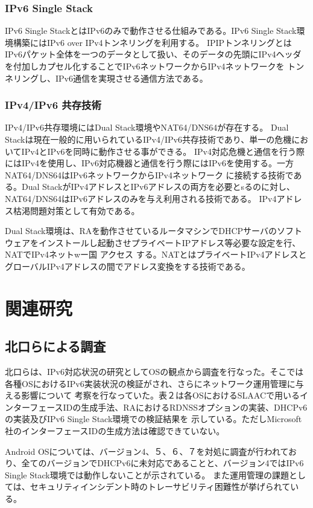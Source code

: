 \documentclass[a4j]{jarticle}
\begin{document}
\subsubsection{IPv6 Single Stack}
IPv6 Single StackとはIPv6のみで動作させる仕組みである。IPv6 Single Stack環境構築にはIPv6 over IPv4トンネリングを利用する。
IPIPトンネリングとはIPv6パケット全体を一つのデータとして扱い、そのデータの先頭にIPv4ヘッダを付加しカプセル化することでIPv6ネットワークからIPv4ネットワークを
トンネリングし、IPv6通信を実現させる通信方法である。
\subsubsection{IPv4/IPv6 共存技術}
IPv4/IPv6共存環境にはDual Stack環境やNAT64/DNS64が存在する。
Dual Stackは現在一般的に用いられているIPv4/IPv6共存技術であり、単一の危機においてIPv4とIPv6を同時に動作させる事ができる。
IPv4対応危機と通信を行う際にはIPv4を使用し、IPv6対応機器と通信を行う際にはIPv6を使用する。一方NAT64/DNS64はIPv6ネットワークからIPv4ネットワーク
に接続する技術である。Dual StackがIPv4アドレスとIPv6アドレスの両方を必要とsるのに対し、NAT64/DNS64はIPv6アドレスのみを与え利用される技術である。
IPv4アドレス枯渇問題対策として有効である。

Dual Stack環境は、RAを動作させているルータマシンでDHCPサーバのソフトウェアをインストールし起動させプライベートIPアドレス等必要な設定を行、NATでIPv4ネットwー国
アクセス
する。NATとはプライベートIPv4アドレスとグローバルIPv4アドレスの間でアドレス変換をする技術である。

\newpage
\section{関連研究} %
\subsection{北口らによる調査}
北口らは、IPv6対応状況の研究としてOSの観点から調査を行なった。そこでは各種OSにおけるIPv6実装状況の検証がされ、さらにネットワーク運用管理に与える影響について
考察を行なっていた。表２は各OSにおけるSLAACで用いるインターフェースIDの生成手法、RAにおけるRDNSSオプションの実装、DHCPv6の実装及びIPv6 Single Stack環境での検証結果を
示している。ただしMicrosoft社のインターフェースIDの生成方法は確認できていない。

Android OSについては、バージョン4、５、６、７を対処に調査が行われており、全てのバージョンでDHCPv6に未対応であることと、バージョン4ではIPv6 Single Stack環境では動作しないことが示されている。
また運用管理の課題としては、セキュリティインシデント時のトレーサビリティ困難性が挙げられている。
\end{document}
